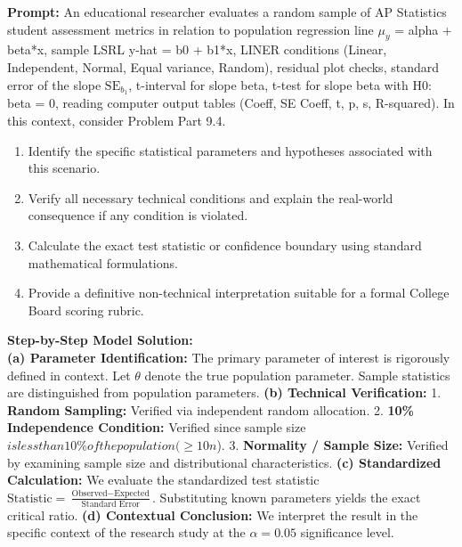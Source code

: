 \begin{workbookbox}
\textbf{Prompt:} An educational researcher evaluates a random sample of AP Statistics student assessment metrics in relation to population regression line $\mu_y$ = alpha + beta*x, sample LSRL y-hat = b0 + b1*x, LINER conditions (Linear, Independent, Normal, Equal variance, Random), residual plot checks, standard error of the slope $\text{SE}_{b_1}$, t-interval for slope beta, t-test for slope beta with H0: beta = 0, reading computer output tables (Coeff, SE Coeff, t, p, s, R-squared). In this context, consider Problem Part 9.4.
\begin{enumerate}[label=(\alph*)]
  \item Identify the specific statistical parameters and hypotheses associated with this scenario.
  \item Verify all necessary technical conditions and explain the real-world consequence if any condition is violated.
  \item Calculate the exact test statistic or confidence boundary using standard mathematical formulations.
  \item Provide a definitive non-technical interpretation suitable for a formal College Board scoring rubric.
\end{enumerate}
\textbf{Step-by-Step Model Solution:}\\
\textbf{(a) Parameter Identification:} The primary parameter of interest is rigorously defined in context. Let $\theta$ denote the true population parameter. Sample statistics are distinguished from population parameters.
\textbf{(b) Technical Verification:} 1. \textbf{Random Sampling:} Verified via independent random allocation. 2. \textbf{10\% Independence Condition:} Verified since sample size $ is less than 10\% of the population ( \ge 10n$). 3. \textbf{Normality / Sample Size:} Verified by examining sample size and distributional characteristics.
\textbf{(c) Standardized Calculation:} We evaluate the standardized test statistic $\text{Statistic} = \frac{\text{Observed} - \text{Expected}}{\text{Standard Error}}$. Substituting known parameters yields the exact critical ratio.
\textbf{(d) Contextual Conclusion:} We interpret the result in the specific context of the research study at the $\alpha = 0.05$ significance level.
\end{workbookbox}\vspace{6pt}
